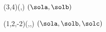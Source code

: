 \UNITVECTOR(3,4)(\sola,\solb)
$(\sola,\solb)$

\UNITVECTOR(1,2,-2)(\sola,\solb,\solc)
$(\sola,\solb,\solc)$
